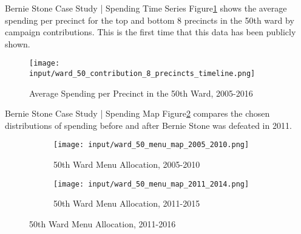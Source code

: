 \begin{frame}{Bernie Stone Case Study | Spending Time Series}
Figure\ref*{fig:stone_spending_timeline} shows the average spending per precinct for the top and bottom 8 precincts in the 50th ward by campaign contributions.
This is the first time that this data has been publicly shown.
    \begin{figure}[H]
        \centering
        \texttt{[image: input/ward\_50\_contribution\_8\_precincts\_timeline.png]}
        \caption{Average Spending per Precinct in the 50th Ward, 2005-2016}
        \label{fig:stone_spending_timeline}
    \end{figure}
\end{frame}

\begin{frame}{Bernie Stone Case Study | Spending Map}
Figure\ref*{fig:stone_menu_maps} compares the chosen distributions of spending before and after Bernie Stone was defeated in 2011.
    \begin{figure}[H]
        \centering
        \begin{subfigure}[b]{0.3\textwidth} %
        \texttt{[image: input/ward\_50\_menu\_map\_2005\_2010.png]}
        \caption{50th Ward Menu Allocation, 2005-2010}
        \end{subfigure}
        \begin{subfigure}[b]{0.3\textwidth}
        \texttt{[image: input/ward\_50\_menu\_map\_2011\_2014.png]}
        \caption{50th Ward Menu Allocation, 2011-2015}
        \end{subfigure}
        \caption{50th Ward Menu Allocation, 2011-2016}
        \label{fig:stone_menu_maps}
    \end{figure}
\end{frame}
